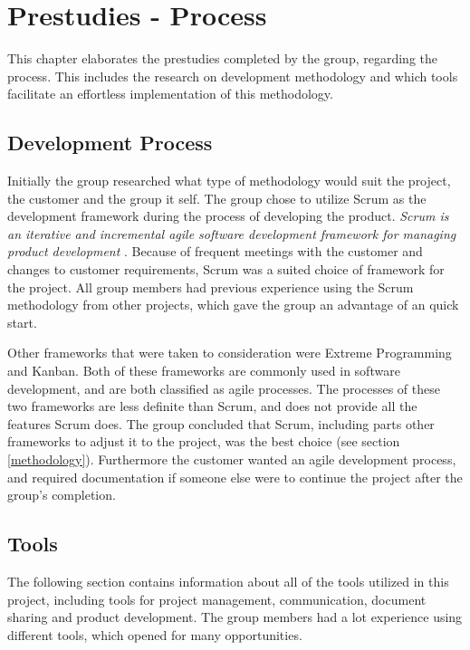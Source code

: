 
\chapter{Prestudies - Process}

This chapter elaborates the prestudies completed by the group, regarding the process. This includes the research on development methodology and which tools facilitate an effortless implementation of this methodology. 

\section{Development Process} \label{s:development_process}
Initially the group researched what type of methodology would suit the project, the customer and the group it self. The group chose to utilize Scrum as the development framework during the process of developing the product. \textit{Scrum is an iterative and incremental agile software development framework for managing product development} \cite{scrumWikipedia}. Because of frequent meetings with the customer and changes to customer requirements, Scrum was a suited choice of framework for the project. All group members had previous experience using the Scrum methodology from other projects, which gave the group an advantage of an quick start. 

Other frameworks that were taken to consideration were Extreme Programming and Kanban. Both of these frameworks are commonly used in software development, and are both classified as agile processes. The processes of these two frameworks are less definite than Scrum, and does not provide all the features Scrum does. The group concluded that Scrum, including parts other frameworks to adjust it to the project, was the best choice (see section \ref{methodology}). Furthermore the customer wanted an agile development process, and required documentation if someone else were to continue the project after the group's completion. 

\section{Tools}
\label{tools}
The following section contains information about all of the tools utilized in this project, including tools for project management, communication, document sharing and product development. The group members had a lot experience using different tools, which opened for many opportunities.

